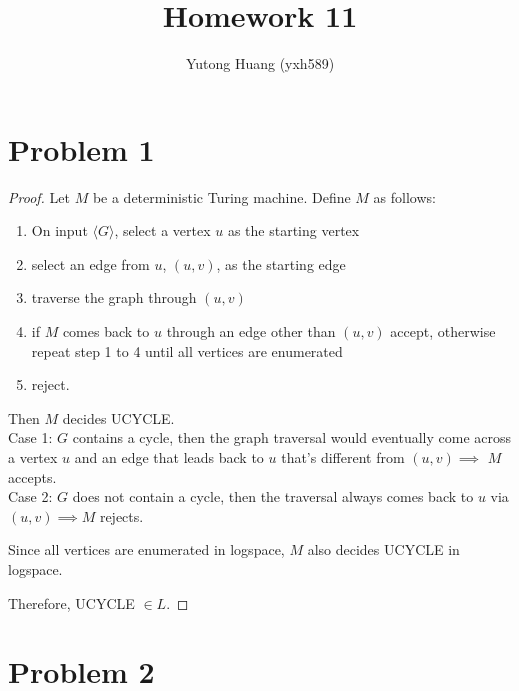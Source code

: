 \documentclass[letterpaper]{article}
\title{\vspace{-2cm}Homework 11}
\author{Yutong Huang (yxh589)}
\date{}
\begin{document}
\maketitle
\section*{Problem 1}
\begin{proof}
    Let $M$ be a deterministic Turing machine. Define $M$ as follows:
    \begin{enumerate}
        \item On input $\langle G \rangle$, select a vertex $u$ as the starting vertex
        \item select an edge from $u$, $(u, v)$, as the starting edge
        \item traverse the graph through $(u,v)$
        \item if $M$ comes back to $u$ through an edge other than $(u, v)$ accept, otherwise repeat step 1 to 4 until all vertices are enumerated
        \item reject.
    \end{enumerate}
    Then $M$ decides UCYCLE.\\
    Case 1: $G$ contains a cycle, then the graph traversal would eventually come across a vertex $u$ and an edge that leads back to 
    $u$ that's different from $(u,v) \implies$ $M$ accepts.\\
    Case 2: $G$ does not contain a cycle, then the traversal always comes back to $u$ via $(u,v) \implies M$ rejects.

    Since all vertices are enumerated in logspace, $M$ also decides UCYCLE in logspace.

    Therefore, UCYCLE $\in L$.
\end{proof}

\section*{Problem 2}
\end{document}
